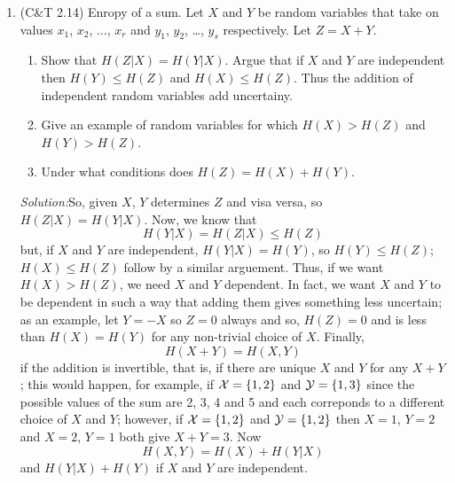 \documentclass[12pt]{article}
\newcommand{\soln}{\noindent\textit{Solution:}}
\begin{document}
\begin{enumerate}
\item (C\&T 2.14) Enropy of a sum. Let $X$ and $Y$ be random variables that take on values $x_1$, $x_2$, $\ldots$, $x_r$ and $y_1$, $y_2$, \ldots, $y_s$ respectively. Let $Z=X+Y$.
\begin{enumerate}
\item Show that $H(Z|X)=H(Y|X)$. Argue that if $X$ and $Y$ are independent then $H(Y)\le H(Z)$ and $H(X)\le H(Z)$. Thus the addition of independent random variables add uncertainy.
\item Give an example of random variables for which $H(X)>H(Z)$ and $H(Y)>H(Z)$.
\item Under what conditions does $H(Z)=H(X)+H(Y)$.
\end{enumerate}

\soln So, given $X$, $Y$ determines $Z$ and visa versa, so
$H(Z|X)=H(Y|X)$. Now, we know that
\begin{equation}
H(Y|X)=H(Z|X)\le H(Z)
\end{equation}
but, if $X$ and $Y$ are independent, $H(Y|X)=H(Y)$, so $H(Y)\le H(Z)$; $H(X)\le H(Z)$ follow by  a similar arguement. Thus, if we want $H(X)>H(Z)$, we need $X$ and $Y$ dependent. In fact, we want $X$ and $Y$ to be dependent in such a way that adding them gives something less uncertain; as an example, let $Y=-X$ so $Z=0$ always and so, $H(Z)=0$ and is less than $H(X)=H(Y)$ for any non-trivial choice of $X$. Finally, 
\begin{equation}
H(X+Y)=H(X,Y)
\end{equation}
if the addition is invertible, that is, if there are unique $X$ and $Y$ for any $X+Y$; this would happen, for example, if ${\cal X}=\{1,2\}$ and ${\cal Y}=\{1,3\}$ since the possible values of the sum are 2, 3, 4 and 5 and each correponds to a different choice of $X$ and $Y$; however, if  ${\cal X}=\{1,2\}$ and ${\cal Y}=\{1,2\}$ then $X=1$, $Y=2$ and $X=2$, $Y=1$ both give $X+Y=3$. Now
\begin{equation}
H(X,Y)=H(X)+H(Y|X)
\end{equation}
and $H(Y|X)+H(Y)$ if $X$ and $Y$ are independent.



\end{enumerate}
\end{document}

